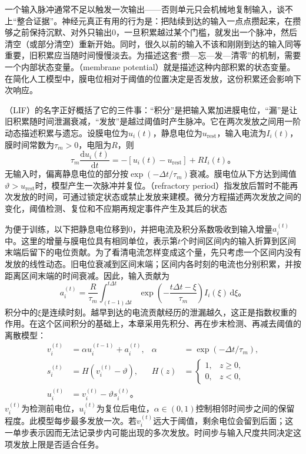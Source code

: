 一个输入脉冲通常不足以触发一次输出——否则单元只会机械地复制输入，谈不上“整合证据”。神经元真正有用的行为是：把陆续到达的输入一点点攒起来，在攒够之前保持沉默、对外只输出0，一旦积累越过某个门槛，就发出一个脉冲，然后清空（或部分清空）重新开始。同时，很久以前的输入不该和刚刚到达的输入同等重要，旧积累应当随时间慢慢淡去。为描述这套“攒—忘—发—清零”的机制，需要一个内部状态变量。（membrane potential）就是描述这种内部积累的状态变量。在简化人工模型中，膜电位相对于阈值的位置决定是否发放，这份积累还会影响下次响应。

（LIF）的名字正好概括了它的三件事：“积分”是把输入累加进膜电位，“漏”是让旧积累随时间泄漏衰减，“发放”是越过阈值时产生脉冲。它在两次发放之间用一阶动态描述积累与遗忘。设膜电位为$u_i(t)$，静息电位为$u_{\mathrm{rest}}$，输入电流为$I_i(t)$，膜时间常数为$\tau_m>0$，电阻为$R$，则
\begin{equation}
  \tau_m\frac{\mathrm d u_i(t)}{\mathrm d t}
  =-[u_i(t)-u_{\mathrm{rest}}]+RI_i(t)\text{。}
  \label{eq:snn-continuous-lif}
\end{equation}
无输入时，偏离静息电位的部分按$\exp(-\Delta t/\tau_m)$衰减。膜电位从下方达到阈值$\vartheta>u_{\mathrm{rest}}$时，模型产生一次脉冲并复位。（refractory period）指发放后暂时不能再次发放的时间，可通过锁定状态或禁止发放来建模。微分方程描述两次发放之间的变化，阈值检测、复位和不应期再规定事件产生及其后的状态

为便于训练，以下把静息电位移到0，并把电流及积分系数吸收到输入增量$a_i^{(t)}$中。这里的增量与膜电位具有相同单位，表示第$t$个时间区间内的输入折算到区间末端后留下的电位贡献。为了看清电流怎样变成这个量，先只考虑一个区间内没有发放的线性动态。旧电位衰减到区间末端；区间内各时刻的电流也分别积累，并按距离区间末端的时间衰减。因此，输入贡献为
\begin{equation}
  a_i^{(t)}=\frac{R}{\tau_m}
  \int_{(t-1)\Delta t}^{t\Delta t}
  \exp\!\left(-\frac{t\Delta t-\xi}{\tau_m}\right)I_i(\xi)\,\mathrm d\xi\text{。}
  \label{eq:snn-input-increment}
\end{equation}
积分中的$\xi$是连续时刻。越早到达的电流贡献经历的泄漏越久，这正是指数权重的作用。在这个区间积分的基础上，本章采用先积分、再在步末检测、再减去阈值的离散模型：
\begin{align}
  v_i^{(t)}&=\alpha u_i^{(t-1)}+a_i^{(t)},
  &\alpha&=\exp(-\Delta t/\tau_m),\label{eq:snn-discrete-integrate}\\
  s_i^{(t)}&=H(v_i^{(t)}-\vartheta),
  &H(z)&=\begin{cases}1,&z\geq0,\\0,&z<0,\end{cases}
  \label{eq:snn-discrete-fire}\\
  u_i^{(t)}&=v_i^{(t)}-\vartheta s_i^{(t)}\text{。}
  \label{eq:snn-soft-reset}
\end{align}
$v_i^{(t)}$为检测前电位，$u_i^{(t)}$为复位后电位，$\alpha\in(0,1)$控制相邻时间步之间的保留程度。此模型每步最多发放一次。若$v_i^{(t)}$远大于阈值，剩余电位会留到后面；这一单步表示因而无法记录步内可能出现的多次发放。时间步与输入尺度共同决定这项发放上限是否适合任务。

